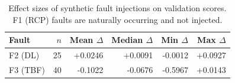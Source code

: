 \begin{table}[htbp]
\centering
\caption{Effect sizes of synthetic fault injections on validation scores. F1 (RCP) faults are naturally occurring and not injected.}
\label{tab:injection_effects}
\small
\begin{tabular}{lrrrrr}
\toprule
Fault & $n$ & Mean $\Delta$ & Median $\Delta$ & Min $\Delta$ & Max $\Delta$ \\
\midrule
F2 (DL) & 25 & +0.0246 & +0.0091 & -0.0012 & +0.0927 \\
F3 (TBF) & 40 & -0.1022 & -0.0676 & -0.5967 & +0.0143 \\
\bottomrule
\end{tabular}
\end{table}